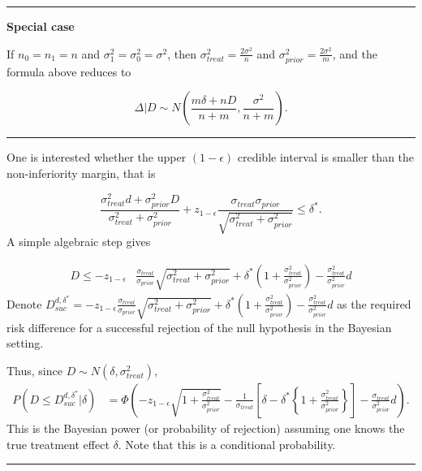 \documentclass[
]{book}
\begin{document}
\begin{center}\rule{0.5\linewidth}{0.5pt}\end{center}

\textbf{Special case}

If \(n_0=n_1=n\) and \(\sigma_1^2=\sigma_0^2=\sigma^2\), then \(\sigma_{treat}^2=\frac{2\sigma^2}{n}\) and \(\sigma_{prior}^2=\frac{2\sigma^2}{m}\), and the formula above reduces to

\[
\Delta|D \sim N\left(\frac{m\delta+nD}{n+m}, \frac{\sigma^2}{n+m} \right).
\]

\begin{center}\rule{0.5\linewidth}{0.5pt}\end{center}

One is interested whether the upper \((1-\epsilon)\) credible interval is smaller than the non-inferiority margin, that is

\[
\frac{\sigma^2_{treat}d+\sigma^2_{prior}D}{\sigma^2_{treat}+\sigma^2_{prior}}+z_{1-\epsilon}\frac{\sigma_{treat}\sigma_{prior}}{\sqrt{\sigma^2_{treat}+\sigma^2_{prior}}}\leq \delta^*.
\]
A simple algebraic step gives

\[
\begin{aligned}
D\leq -z_{1-\epsilon}&\frac{\sigma_{treat}}{\sigma_{prior}}\sqrt{\sigma^2_{treat}+\sigma^2_{prior}}+\delta^*\left(1+\frac{\sigma_{treat}^2}{\sigma_{prior}^2}\right)-\frac{\sigma^2_{treat}}{\sigma^2_{prior}}d
\end{aligned}
\]
Denote \(D_{suc}^{d,\delta^*}=-z_{1-\epsilon}\frac{\sigma_{treat}}{\sigma_{prior}}\sqrt{\sigma^2_{treat}+\sigma^2_{prior}}+\delta^*\left(1+\frac{\sigma_{treat}^2}{\sigma_{prior}^2}\right)-\frac{\sigma^2_{treat}}{\sigma^2_{prior}}d\) as the required risk difference for a successful rejection of the null hypothesis in the Bayesian setting.

Thus, since \(D\sim N(\delta, \sigma_{treat}^2)\),
\[
\begin{aligned}
P(D\leq D_{suc}^{d,\delta^*}|\delta)&=\Phi\left(-z_{1-\epsilon}\sqrt{1+\frac{\sigma^2_{treat}}{\sigma_{prior}^2}}-\frac{1}{\sigma_{treat}}\left[\delta-\delta^*\left\{ 1+\frac{\sigma_{treat}^2}{\sigma_{prior}^2} \right\} \right]-\frac{\sigma_{treat}}{\sigma_{prior}^2}d \right).
\end{aligned}
\]
This is the Bayesian power (or probability of rejection) assuming one knows the true treatment effect \(\delta\). Note that this is a conditional probability.

\begin{center}\rule{0.5\linewidth}{0.5pt}\end{center}
\end{document}
